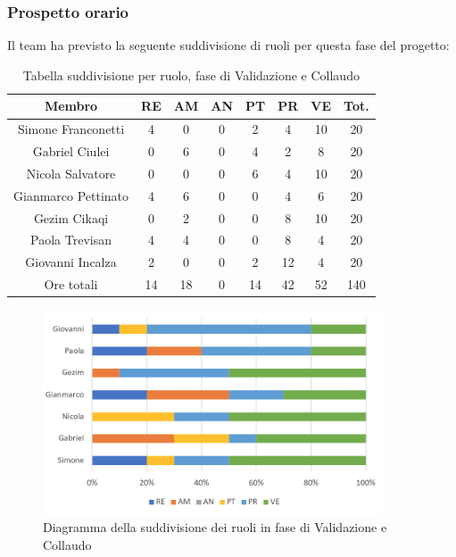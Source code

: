 \subsubsection{Prospetto orario}
Il team ha previsto la seguente suddivisione di ruoli per questa fase del progetto:
\begin{table}[h]
\caption{Tabella suddivisione per ruolo, fase di Validazione e Collaudo}  
\begin{center}
\begin{tabular}{ |c|c|c|c|c|c|c|c|  }
 \hline
 Membro 		& RE 	& AM 	& AN 	& PT 	& PR 	& VE 	& Tot.\\
 \hline\hline
 Simone Franconetti			& 4 		& 0		& 0 	& 2 		& 4 		& 10 		& 20\\
 Gabriel Ciulei		& 0 		& 6 		& 0 	& 4		& 2 		& 8 		& 20\\
 Nicola	Salvatore		& 0 		& 0 		& 0 	& 6 		& 4 		& 10 		& 20\\
 Gianmarco Pettinato		& 4 		& 6 		& 0 	& 0	 	& 4 		& 6 		& 20\\
 Gezim Cikaqi			& 0 		& 2 		& 0 	& 0 		& 8 		& 10	 	& 20\\
 Paola Trevisan			& 4 		& 4 		& 0 	& 0 		& 8 		& 4 		& 20\\
 Giovanni Incalza		& 2 		& 0	 	& 0 	& 2 		& 12 	& 4  	& 20\\
 \hline\hline
 Ore totali		& 14		& 18		& 0 	& 14	 	& 42 	& 52 	& 140\\
  \hline
\end{tabular}
\end{center}
\end{table}
\begin{figure}[h!]
	\centering
	\includegraphics[width=0.9\textwidth]{res/img/hi5}
	\caption{Diagramma della suddivisione dei ruoli in fase di Validazione e Collaudo}
\end{figure}

